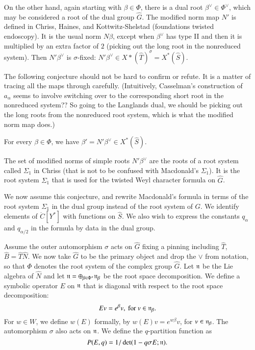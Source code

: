 On the other hand, again starting with $\beta\in\Phi$, there is a dual root $\beta^\vee\in \Phi^\vee$, which may be considered
a root of the dual group $\hat G$.   The modified norm map $N'$ is defined in Chriss, Haines, and Kottwitz-Shelstad (foundations twisted endoscopy).
It is the usual norm $N\beta$, except when $\beta^\vee$ has type II and then it is multiplied by an extra factor of $2$ (picking out the long root in 
the nonreduced system).   Then $N'\beta^\vee$ is $\sigma$-fixed: $N'\beta^\vee\in X*(\hat T)^\sigma = X^*(\hat S)$.

The following conjecture should not be hard to confirm or refute.  It is a matter of tracing all the maps through carefully.
(Intuitively, Casselman's  construction of $a_\alpha$ seems to involve switching over to the corresponding
short root in the nonreduced system??  So going to the Langlands dual, we should be picking out the long roots from the nonreduced root system, which is what the 
modified norm map does.)  

\begin{conjecture} For every $\beta\in\Phi$, we have $\beta' = N'\beta^\vee\in X^*(\hat S)$.
\end{conjecture}

The set of modified norms of simple roots $N'\beta^\vee$ are the roots of a root system called $\Sigma_1$ in Chriss (that is not to be confused
with Macdonald's $\Sigma_1$).   It is the root system $\Sigma_1$ that is used for the twisted Weyl character formula on $\hat G$.

We now assume this conjecture, and
rewrite Macdonald's formula in terms of the root system  $\Sigma_1$ in the dual group instead of the root system of $G$.
We identify elements of $\ring{C}[Y^*]$ with functions on $\hat S$.  We also wish to express the constants $q_\alpha$ and $q_{\alpha/2}$
in the formula by data in the dual group.

Assume the outer automorphism $\sigma$ acts on $\hat G$ fixing a pinning including $\hat T$, $\hat B = \hat T \hat N$.  We now take $\hat G$ to be the
primary object and drop the $\vee$ from notation, so that $\Phi$ denotes the  root system of the complex group $\hat G$.
Let ${\mathfrak n}$ be the Lie algebra of $\hat N$ and
let ${\mathfrak n} = \oplus_{\beta\in \Phi^+} {\mathfrak n}_\beta$ be the root space decomposition.  We define a symbolic operator $E$ on ${\mathfrak n}$ that is diagonal with
respect to the root space decomposition:
\[
E v = e^{\beta} v, \text{ for } v \in {\mathfrak n}_\beta.
\]
For $w\in W$, we define $w(E)$ formally, by $w(E) v = e^{ w \beta} v$, for $v\in {\mathfrak n}_\beta$.
The automorphism $\sigma$ also acts on ${\mathfrak n}$.  We define the $q$-partition function as
\[
P(E,q) = 1/\det(1 - q \sigma E;{\mathfrak n}).
\]


